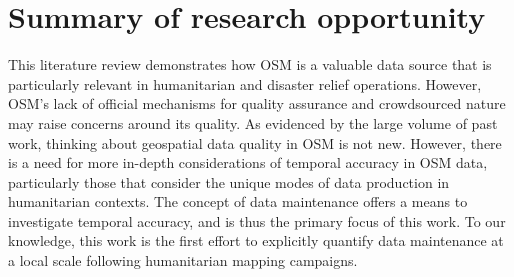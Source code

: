 \section{Summary of research opportunity}

This literature review demonstrates how OSM is a valuable data source that is particularly relevant in humanitarian and disaster relief operations. However, OSM’s lack of official mechanisms for quality assurance and crowdsourced nature may raise concerns around its quality. As evidenced by the large volume of past work, thinking about geospatial data quality in OSM is not new. However, there is a need for more in-depth considerations of temporal accuracy in OSM data, particularly those that consider the unique modes of data production in humanitarian contexts. The concept of data maintenance offers a means to investigate temporal accuracy, and is thus the primary focus of this work. To our knowledge, this work is the first effort to explicitly quantify data maintenance at a local scale following humanitarian mapping campaigns. 